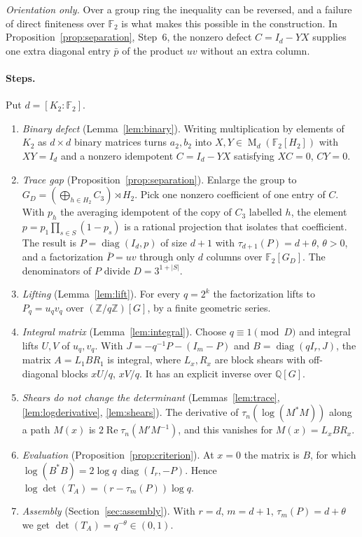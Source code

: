 \documentclass[11pt]{article}
\theoremstyle{remark}
\numberwithin{equation}{section}
\newcommand{\F}{\mathbb F}
\newcommand{\Z}{\mathbb Z}
\newcommand{\Q}{\mathbb Q}
\newcommand{\Mat}{\operatorname{M}}
\newcommand{\diag}{\operatorname{diag}}
\begin{document}
\emph{Orientation only.} Over a group ring the inequality can be reversed, and a failure of direct finiteness over $\F_2$ is what makes this possible in the construction. In Proposition~\ref{prop:separation}, Step~6, the nonzero defect $C=I_d-YX$ supplies one extra diagonal entry $\bar p$ of the product $uv$ without an extra column.

\paragraph{Steps.}
Put $d=[K_2:\F_2]$.
\begin{enumerate}[label=(\arabic*),leftmargin=2.2em]
\item \emph{Binary defect} (Lemma~\ref{lem:binary}). Writing multiplication by elements of $K_2$ as $d\times d$ binary matrices turns $a_2,b_2$ into $X,Y\in\Mat_d(\F_2[H_2])$ with $XY=I_d$ and a nonzero idempotent $C=I_d-YX$ satisfying $XC=0$, $CY=0$.
\item \emph{Trace gap} (Proposition~\ref{prop:separation}). Enlarge the group to $G_D=(\bigoplus_{h\in H_2}C_3)\rtimes H_2$. Pick one nonzero coefficient of one entry of $C$. With $p_h$ the averaging idempotent of the copy of $C_3$ labelled $h$, the element $p=p_1\prod_{s\in S}(1-p_s)$ is a rational projection that isolates that coefficient. The result is $P=\diag(I_d,p)$ of size $d+1$ with $\tau_{d+1}(P)=d+\theta$, $\theta>0$, and a factorization $\bar P=uv$ through only $d$ columns over $\F_2[G_D]$. The denominators of $P$ divide $D=3^{1+|S|}$.
\item \emph{Lifting} (Lemma~\ref{lem:lift}). For every $q=2^k$ the factorization lifts to $P_q=u_qv_q$ over $(\Z/q\Z)[G]$, by a finite geometric series.
\item \emph{Integral matrix} (Lemma~\ref{lem:integral}). Choose $q\equiv1\pmod D$ and integral lifts $U,V$ of $u_q,v_q$. With $J=-q^{-1}P-(I_m-P)$ and $B=\diag(qI_r,J)$, the matrix $A=L_1BR_1$ is integral, where $L_x,R_x$ are block shears with off-diagonal blocks $xU/q$, $xV/q$. It has an explicit inverse over $\Q[G]$.
\item \emph{Shears do not change the determinant} (Lemmas~\ref{lem:trace}, \ref{lem:logderivative}, \ref{lem:shears}). The derivative of $\tau_n(\log(M^*M))$ along a path $M(x)$ is $2\operatorname{Re}\tau_n(M'M^{-1})$, and this vanishes for $M(x)=L_xBR_x$.
\item \emph{Evaluation} (Proposition~\ref{prop:criterion}). At $x=0$ the matrix is $B$, for which $\log(B^*B)=2\log q\,\diag(I_r,-P)$. Hence $\log\det(T_A)=(r-\tau_m(P))\log q$.
\item \emph{Assembly} (Section~\ref{sec:assembly}). With $r=d$, $m=d+1$, $\tau_m(P)=d+\theta$ we get $\det(T_A)=q^{-\theta}\in(0,1)$.
\end{enumerate}
\end{document}
